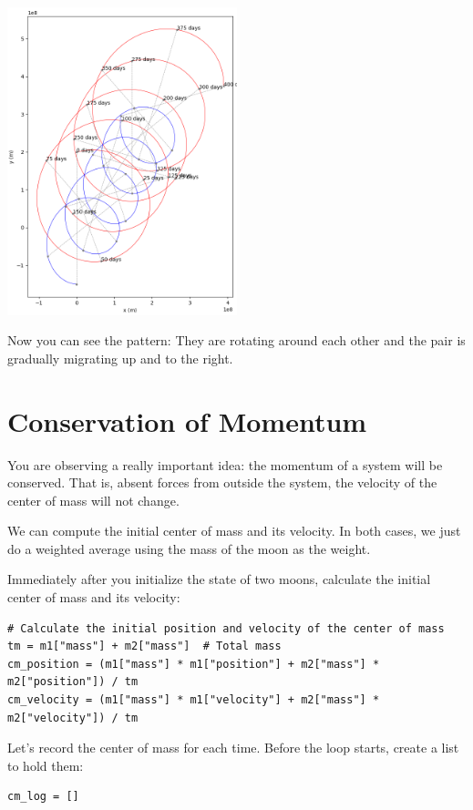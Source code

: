 \includegraphics[width=0.5\textwidth]{plotmoons_03.png}

Now you can see the pattern: They are rotating around each other and the pair is gradually migrating
up and to the right.

\section{Conservation of Momentum}

You are observing a really important idea: the momentum of a system will be conserved.   That is,  absent forces from outside the system,  the velocity of the center of mass will not change.

We can compute the initial center of mass and its velocity.   In both cases,  we just do a weighted average using the mass of the moon as the weight. 

Immediately after you initialize the state of two moons,  calculate the initial center of mass and its velocity:
\begin{verbatim}
# Calculate the initial position and velocity of the center of mass
tm = m1["mass"] + m2["mass"]  # Total mass
cm_position = (m1["mass"] * m1["position"] + m2["mass"] * m2["position"]) / tm
cm_velocity = (m1["mass"] * m1["velocity"] + m2["mass"] * m2["velocity"]) / tm
\end{verbatim}

Let's record the center of mass for each time.   Before the loop starts,  create a list to hold them:

\begin{verbatim}
cm_log = []
\end{verbatim}

